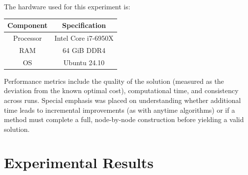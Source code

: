 \documentclass[11pt]{article}
\begin{document}
	The hardware used for this experiment is:
	\begin{center}
		\begin{tabular}{|c|c|}
			\hline
			Component & Specification \\
			\hline
			Processor & Intel Core i7-6950X  \\
			\hline
			RAM & 64 GiB DDR4 \\
			\hline
			OS & Ubuntu 24.10  \\
			\hline
		\end{tabular}
	\end{center}
	
	Performance metrics include the quality of the solution (measured as the deviation from the known optimal cost), computational time, and consistency across runs. Special emphasis was placed on understanding whether additional time leads to incremental improvements (as with anytime algorithms) or if a method must complete a full, node-by-node construction before yielding a valid solution.
	
	\section{Experimental Results}
\end{document}

